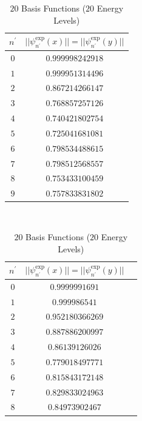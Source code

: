 \documentclass[../main.tex]{subfiles}
\begin{document}
\begin{table}[!ht]
  \centering
  \begin{subtable}{.4\linewidth}
      \centering
      \begin{tabular}{ | c | c | }
        \hline
        $n^\prime$ & $||\psi_{n^\prime}^\textrm{exp}(x)|| = ||\psi_{n^\prime}^\textrm{exp}(y)||$\\*
        \hline
        $0$ & $0.999998242918$\\*
        \hline
        $1$ & $0.999951314496$\\*
        \hline
        $2$ & $0.867214266147$\\*
        \hline
        $3$ & $0.768857257126$\\*
        \hline
        $4$ & $0.740421802754$\\*
        \hline
        $5$ & $0.725041681081$\\*
        \hline
        $6$ & $0.798534488615$\\*
        \hline
        $7$ & $0.798512568557$\\*
        \hline
        $8$ & $0.753433100459$\\*
        \hline
        $9$ & $0.757833831802$\\*
        \hline
      \end{tabular}
      \caption{$20$ Basis Functions ($20$ Energy Levels)}
      \label{tab:NormE20Square}
  \end{subtable}
  ~
  \begin{subtable}{.4\linewidth}
    \centering
    \begin{tabular}{ | c | c | c | }
        \hline
        $n^\prime$ & $||\psi_{n^\prime}^\textrm{exp}(x)|| = ||\psi_{n^\prime}^\textrm{exp}(y)||$\\*
        \hline
        $0$ & $0.9999991691$\\*
        \hline
        $1$ & $0.999986541$\\*
        \hline
        $2$ & $0.952180366269$\\*
        \hline
        $3$ & $0.887886200997$\\*
        \hline
        $4$ & $0.86139126026$\\*
        \hline
        $5$ & $0.779018497771$\\*
        \hline
        $6$ & $0.815843172148$\\*
        \hline
        $7$ & $0.829833024963$\\*
        \hline
        $8$ & $0.84973902467$\\*

\end{tabular}
\end{subtable}
\end{table}
\end{document}
